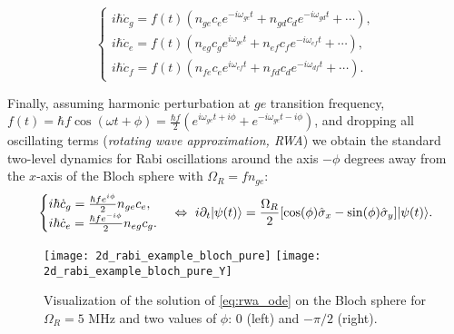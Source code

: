 \documentclass[12pt, twoside]{report}
\DeclarePairedDelimiter\ket{\lvert}{\rangle}
\numberwithin{equation}{section}
\begin{document}
\begin{equation*}
\begin{cases}
i\hbar \dot c_g =  f(t) (n_{ge} c_e e^{-i\omega_{ge}t}+ n_{gd} c_d  e^{-i\omega_{gd}t} + \cdots),\\
i\hbar \dot c_e =  f(t) (n_{eg} c_g e^{i\omega_{ge}t} + n_{ef} c_f e^{-i\omega_{ef}t}+ \cdots),\\
i\hbar \dot c_f =   f(t) (n_{fe} c_e e^{i\omega_{ef}t}+ n_{fd} c_d e^{-i\omega_{df}t} + \cdots).
\end{cases}
\end{equation*}

Finally, assuming harmonic perturbation at $ge$ transition frequency, $f(t) = \hbar f \cos(\omega t + \phi ) = \frac{\hbar f}{2}(e^{i\omega_{ge} t+i\phi} + e^{-i\omega_{ge} t-i\phi})$, and dropping all oscillating terms (\textit{rotating wave approximation, RWA}) we obtain the standard two-level dynamics for Rabi oscillations around the axis $-\phi$ degrees away from the $x$-axis of the Bloch sphere with  $\Omega_R = f n_{ge}$:
\begin{equation}
\begin{cases}
i\hbar \dot c_g =  \frac{\hbar fe^{i\phi}}{2} n_{ge} c_e,\\
i\hbar \dot c_e =   \frac{\hbar fe^{-i\phi}}{2} n_{eg} c_g.
\end{cases} \Leftrightarrow\  i\partial_t \ket{\psi (t)} = \frac{\Omega_R}{2}[\cos(\phi)\hat \sigma_x - \sin(\phi)\hat \sigma_y]\ket{\psi(t)}.
\label{eq:rwa_ode}
\end{equation}

\begin{figure}
\centering
\texttt{[image: 2d\_rabi\_example\_bloch\_pure]}\quad
\texttt{[image: 2d\_rabi\_example\_bloch\_pure\_Y]}
\caption{Visualization of the solution of \eqref{eq:rwa_ode} on the Bloch sphere for $\Omega_R=5$ MHz and two values of $\phi$: 0 (left) and $-\pi/2$ (right).}
\label{fig:bloch_rot}
\end{figure}
\end{document}
